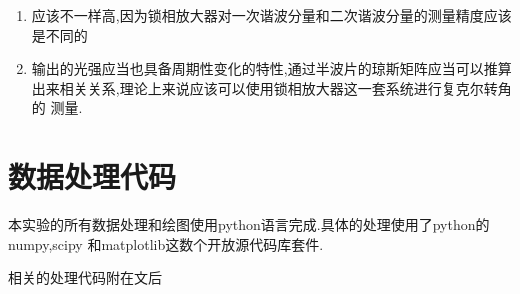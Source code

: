 \documentclass[aps,pre,12pt,preprint,onecolumn,showpacs,showkeys]{revtex4-1}
\begin{document}
\begin{enumerate}
    \item 应该不一样高,因为锁相放大器对一次谐波分量和二次谐波分量的测量精度应该
        是不同的
    \item 输出的光强应当也具备周期性变化的特性,通过半波片的琼斯矩阵应当可以推算
        出来相关关系,理论上来说应该可以使用锁相放大器这一套系统进行复克尔转角的
        测量.
\end{enumerate}

\section{数据处理代码}

本实验的所有数据处理和绘图使用python语言完成.具体的处理使用了python的numpy,scipy
和matplotlib这数个开放源代码库套件.

相关的处理代码附在文后


\end{document}
